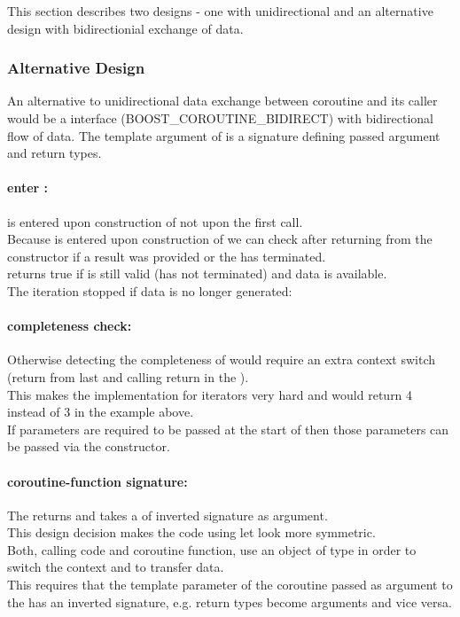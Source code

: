 This section describes two designs - one with unidirectional and an alternative
design with bidirectionial exchange of data.\\

\subsubsection*{Alternative Design}
An alternative to unidirectional data exchange between coroutine and its caller
would be a interface (BOOST_COROUTINE_BIDIRECT) with bidirectional flow of data.
The template argument of \coro is a signature defining passed argument and
return types.

\paragraph*{enter \corofunction:}
\corofunction is entered upon construction of \coro not upon the first call.\\
\newline
Because \corofunction is entered upon construction of \coro we can check after
returning from the constructor if a result was provided or the \corofunction
has terminated.\\
\corobool returns true if \coro is still valid (\corofunction has not terminated)
and data is available.\\
The iteration stopped if data is no longer generated:

\paragraph*{completeness check:}
Otherwise detecting the completeness of \coro would require an extra context
switch (return from last \coroop and calling return in the \corofunction).\\
This makes the implementation for iterators very hard and 
would return 4 instead of 3 in the example above.\\
\newline
If parameters are required to be passed at the start of \corofunction then those
parameters can be passed via the \coro constructor.

\paragraph*{coroutine-function signature:}
The \corofunction returns  and takes a \coro of inverted signature
as argument.\\
\newline
This design decision makes the code using \coro let look more symmetric.\\
Both, calling code and coroutine function, use an object of type \coro in order
to switch the context and to transfer data.\\
This requires that the template parameter of the coroutine passed as argument
to the \corofunction has an inverted signature, e.g. return types become
arguments and vice versa.

